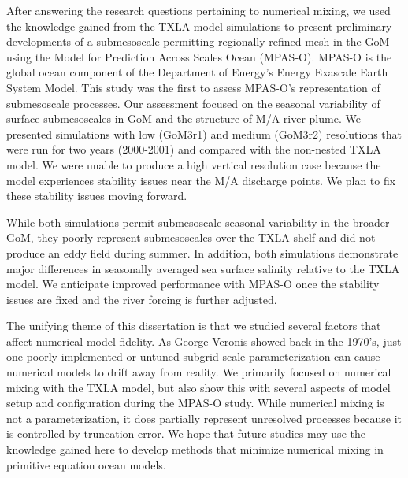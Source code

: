 After answering the research questions pertaining to numerical mixing, we used the knowledge gained from the TXLA model simulations to present preliminary developments of a submesoscale-permitting regionally refined mesh in the GoM using the Model for Prediction Across Scales Ocean (MPAS-O). MPAS-O is the global ocean component of the Department of Energy's Energy Exascale Earth System Model. This study was the first to assess MPAS-O's representation of submesoscale processes. Our assessment focused on the seasonal variability  of surface submesoscales in GoM and the structure of M/A river plume. We presented simulations with low (GoM3r1) and medium (GoM3r2) resolutions that were run for two years (2000-2001) and compared with the non-nested TXLA model. We were unable to produce a high vertical resolution case because the model experiences stability issues near the M/A discharge points. We plan to fix these stability issues moving forward. 

While both simulations permit submesoscale seasonal variability in the broader GoM, they poorly represent submesoscales over the TXLA shelf and did not produce an eddy field during summer. In addition, both simulations demonstrate major differences in seasonally averaged sea surface salinity relative to the TXLA model. We anticipate improved performance with MPAS-O once the stability issues are fixed and the river forcing is further adjusted. 

The unifying theme of this dissertation is that we studied several factors that affect numerical model fidelity. As George Veronis showed back in the 1970's, just one poorly implemented or untuned subgrid-scale parameterization can cause numerical models to drift away from reality. We primarily focused on numerical mixing with the TXLA model, but also show this with several aspects of model setup and configuration during the MPAS-O study. While numerical mixing is not a parameterization, it does partially represent unresolved processes because it is controlled by truncation error. We hope that future studies may use the knowledge gained here to develop methods that minimize numerical mixing in primitive equation ocean models. 


